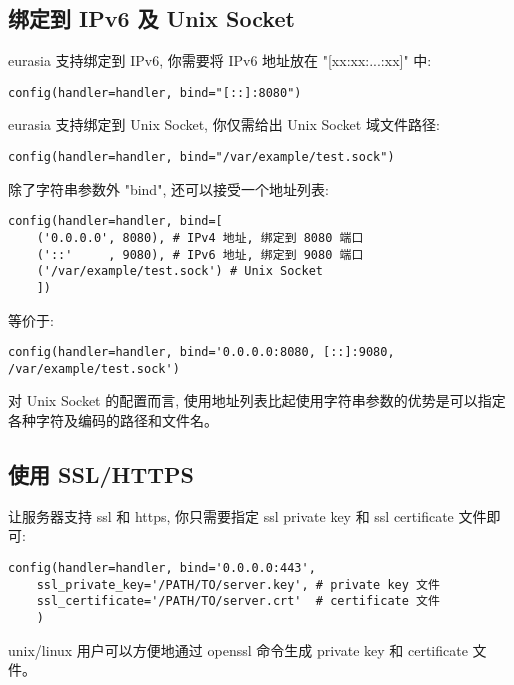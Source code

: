 \documentclass{manual}
\begin{document}
\subsection{绑定到 IPv6 及 Unix Socket}

eurasia 支持绑定到 IPv6, 你需要将 IPv6 地址放在 "[xx:xx:...:xx]" 中:

\begin{verbatim}
config(handler=handler, bind="[::]:8080")
\end{verbatim}

eurasia 支持绑定到 Unix Socket, 你仅需给出 Unix Socket 域文件路径:

\begin{verbatim}
config(handler=handler, bind="/var/example/test.sock")
\end{verbatim}

除了字符串参数外 "bind", 还可以接受一个地址列表:

\begin{verbatim}
config(handler=handler, bind=[
	('0.0.0.0', 8080), # IPv4 地址, 绑定到 8080 端口
	('::'     , 9080), # IPv6 地址, 绑定到 9080 端口
	('/var/example/test.sock') # Unix Socket
	])
\end{verbatim}

等价于:

\begin{verbatim}
config(handler=handler, bind='0.0.0.0:8080, [::]:9080, /var/example/test.sock')
\end{verbatim}

对 Unix Socket 的配置而言,
使用地址列表比起使用字符串参数的优势是可以指定各种字符及编码的路径和文件名。

\subsection{使用 SSL/HTTPS}

让服务器支持 ssl 和 https, 你只需要指定 ssl private key 和 ssl certificate 文件即可:

\begin{verbatim}
config(handler=handler, bind='0.0.0.0:443',
	ssl_private_key='/PATH/TO/server.key', # private key 文件
	ssl_certificate='/PATH/TO/server.crt'  # certificate 文件
	)
\end{verbatim}

unix/linux 用户可以方便地通过 openssl 命令生成 private key 和 certificate 文件。

\end{document}
